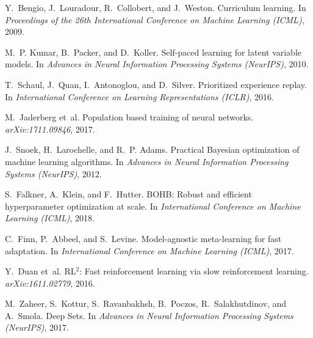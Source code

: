 \documentclass[11pt]{article}
\newcommand{\1}{\mathbf{1}}
\begin{document}

\begin{thebibliography}{30}

Y.~Bengio, J.~Louradour, R.~Collobert, and J.~Weston.
\newblock Curriculum learning.
\newblock In \emph{Proceedings of the 26th International Conference on Machine Learning (ICML)}, 2009.

M.~P. Kumar, B.~Packer, and D.~Koller.
\newblock Self-paced learning for latent variable models.
\newblock In \emph{Advances in Neural Information Processing Systems (NeurIPS)}, 2010.

T.~Schaul, J.~Quan, I.~Antonoglou, and D.~Silver.
\newblock Prioritized experience replay.
\newblock In \emph{International Conference on Learning Representations (ICLR)}, 2016.

M.~Jaderberg et~al.
\newblock Population based training of neural networks.
\newblock \emph{arXiv:1711.09846}, 2017.

J.~Snoek, H.~Larochelle, and R.~P. Adams.
\newblock Practical Bayesian optimization of machine learning algorithms.
\newblock In \emph{Advances in Neural Information Processing Systems (NeurIPS)}, 2012.

S.~Falkner, A.~Klein, and F.~Hutter.
\newblock BOHB: Robust and efficient hyperparameter optimization at scale.
\newblock In \emph{International Conference on Machine Learning (ICML)}, 2018.

C.~Finn, P.~Abbeel, and S.~Levine.
\newblock Model-agnostic meta-learning for fast adaptation.
\newblock In \emph{International Conference on Machine Learning (ICML)}, 2017.

Y.~Duan et~al.
\newblock RL$^2$: Fast reinforcement learning via slow reinforcement learning.
\newblock \emph{arXiv:1611.02779}, 2016.

M.~Zaheer, S.~Kottur, S.~Ravanbakhsh, B.~Poczos, R.~Salakhutdinov, and A.~Smola.
\newblock Deep Sets.
\newblock In \emph{Advances in Neural Information Processing Systems (NeurIPS)}, 2017.


\end{thebibliography}
\end{document}
